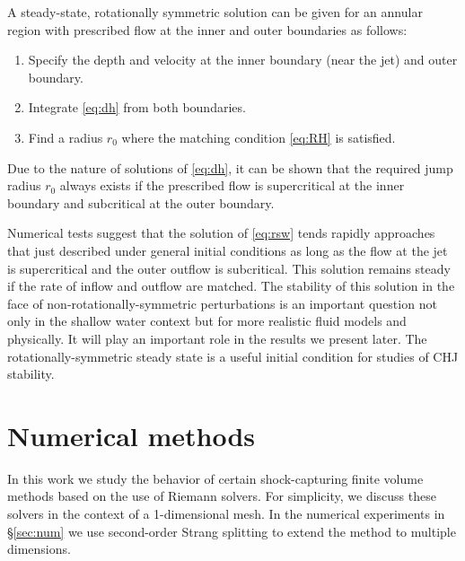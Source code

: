 \documentclass[preprint, 11pt]{article}
\begin{document}
A steady-state, rotationally symmetric solution can be given for an annular region with prescribed
flow at the inner and outer boundaries as follows:

\begin{enumerate}
    \item Specify the depth and velocity at the inner boundary (near the jet) and outer boundary.
    \item Integrate \eqref{eq:dh} from both boundaries.
    \item Find a radius $r_0$ where the matching condition \eqref{eq:RH} is satisfied.
\end{enumerate}
Due to the nature of solutions of \eqref{eq:dh}, it can be shown that the required jump
radius $r_0$ always exists if the prescribed flow is supercritical at the inner boundary
and subcritical at the outer boundary.

Numerical tests suggest that the solution of \eqref{eq:rsw} tends rapidly approaches that
just described under general initial conditions as long as the flow at the jet is
supercritical and the outer outflow is subcritical.  This solution remains steady
if the rate of inflow and outflow are matched.  The stability of this solution in
the face of non-rotationally-symmetric perturbations is an important question not
only in the shallow water context but for more realistic fluid models and physically.
It will play an important role in the results we present later.
The rotationally-symmetric steady state is a useful initial condition for studies
of CHJ stability.

\section{Numerical methods}
In this work we study the behavior of certain shock-capturing finite volume
methods based on the use of Riemann solvers.  For simplicity, we discuss these
solvers in the context of a 1-dimensional mesh.  
In the numerical experiments in \S\ref{sec:num} we use second-order Strang
splitting \cite{strang1968construction} to extend the method to multiple dimensions.
\end{document}
